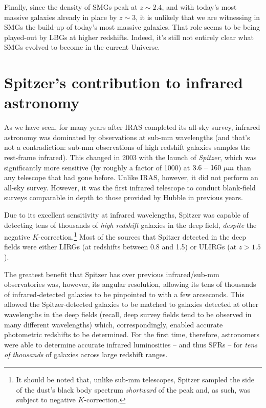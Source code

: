 \documentclass[11pt]{article}
\begin{document}
Finally, since the density of SMGs peak at $z\sim2.4$, and with
today's most massive galaxies already in place by $z\sim3$, it is
unlikely that we are witnessing in SMGs the build-up of today's most
massive galaxies. That role seems to be being played-out by LBGs at
higher redshifts. Indeed, it's still not entirely clear what SMGs
evolved to become in the current Universe.

\section{Spitzer's contribution to infrared astronomy}
As we have seen, for many years after IRAS completed its all-sky
survey, infrared astronomy was dominated by observations at sub-mm
wavelengths (and that's not a contradiction: sub-mm observations of
high redshift galaxies samples the rest-frame infrared). This changed
in 2003 with the launch of {\it Spitzer}, which was significantly more
sensitive (by roughly a factor of 1000) at $3.6 - 160~{\rm \mu m}$
than any telescope that had gone before. Unlike IRAS, however, it did
not perform an all-sky survey. However, it was the first infrared
telescope to conduct blank-field surveys comparable in depth to those
provided by Hubble in previous years.

Due to its excellent sensitivity at infrared wavelengths, Spitzer was
capable of detecting tens of thousands of {\it high redshift}
galaxies in the deep field, {\it despite} the negative
$K$-correction.\footnote{It should be noted that, unlike sub-mm
  telescopes, Spitzer sampled the side of the dust's black body
  spectrum {\it shortward} of the peak and, as such, was subject to
  negative $K$-correction.} Most of the sources that Spitzer detected
in the deep fields were either LIRGs (at redshifts between 0.8 and 1.5)
or ULIRGs (at $z>1.5$).

The greatest benefit that Spitzer has over previous infrared/sub-mm
observatories was, however, its angular resolution, allowing its tens
of thousands of infrared-detected galaxies to be pinpointed to with a
few arcseconds. This allowed the Spitzer-detected galaxies to be
matched to galaxies detected at other wavelengths in the deep fields
(recall, deep survey fields tend to be observed in many different
wavelengths) which, correspondingly, enabled accurate photometric
redshifts to be determined. For the first time, therefore, astronomers
were able to determine accurate infrared luminosities -- and thus SFRs
-- for {\it tens of thousands} of galaxies across large redshift
ranges. 
\end{document}
